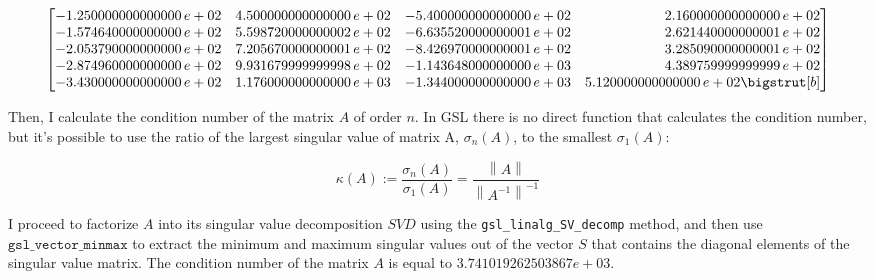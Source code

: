 \documentclass{article}
\newcommand{\code}{\texttt}
\newcommand{\norm}[1]{\left\lVert#1\right\rVert}
\begin{document}
\begin{adjustwidth}{-2em}{-2em}
\[{\begin{bmatrix*}[r]
-1.250000000000000\,e+02 & 4.500000000000000\,e+02 & -5.400000000000000\,e+02 & 2.160000000000000\,e+02 \\
-1.574640000000000\,e+02 & 5.598720000000002\,e+02 & -6.635520000000001\,e+02 & 2.621440000000001\,e+02 \\
-2.053790000000000\,e+02 & 7.205670000000001\,e+02 & -8.426970000000001\,e+02 & 3.285090000000001\,e+02 \\
-2.874960000000000\,e+02 & 9.931679999999998\,e+02 & -1.143648000000000\,e+03 & 4.389759999999999\,e+02 \\
-3.430000000000000\,e+02 & 1.176000000000000\,e+03 & -1.344000000000000\,e+03 & 5.120000000000000\,e+02 \bigstrut[b]
\end{bmatrix*}} \]%
\end{adjustwidth}

Then, I calculate the condition number of the matrix $A$ of order $n$. In GSL there is no direct function that calculates the condition number, but it's possible to use the ratio of the largest singular value of matrix A, $\sigma_n (A)$, to the smallest $\sigma_1 (A)$:

$$\kappa(A) := \frac{\sigma_n (A)}{\sigma_1 (A)}= \frac{\norm{A}}{\norm{A^{-1}}^{-1}}$$

I proceed to factorize $A$ into its singular value decomposition $SVD$ using the \code{gsl\_linalg\_SV\_decomp} method, and then use $\code{gsl\_vector\_minmax}$ to extract the minimum and maximum singular values out of the vector $S$ that contains the diagonal elements of the singular value matrix. The condition number of the matrix $A$ is equal to $3.741019262503867e+03$.\\


\end{document}
